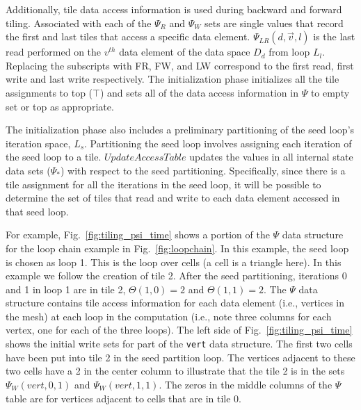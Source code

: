 Additionally, tile data access information is used during backward and forward tiling.
Associated with each of the $\Psi_R$ and $\Psi_W$ sets are single values that record the 
first and last tiles that access
a specific data element.
$\Psi_{LR}(d,\vec{v},l)$ is the last read performed on the $v^{th}$ data element of 
the data space $D_d$ from loop $L_l$.
Replacing the subscripts with FR, FW, and LW correspond to the first read, 
first write and last write respectively.
The initialization phase initializes all the tile assignments to top ($\top$) and sets
all of the data access information in $\Psi$ to empty set or top as appropriate.

The initialization phase also includes a preliminary partitioning of the seed loop's iteration space, $L_s$.
Partitioning the seed loop involves assigning each iteration of the seed loop to a tile. 
$UpdateAccessTable$ updates the values in all internal state data sets ($\Psi_*$) with respect to the 
seed partitioning.  Specifically, since there is a tile assignment for all the iterations in the
seed loop, it will be possible to determine the set of tiles that read and write to each data element
accessed in that seed loop.

For example, Fig.~\ref{fig:tiling_psi_time} shows a portion of the $\Psi$ data structure
for the loop chain example in Fig.~\ref{fig:loopchain}.  
In this example, the seed loop is chosen as loop 1.
This is the loop over cells (a cell is a triangle here).
In this example we follow the creation of tile 2.
After the seed partitioning, iterations 0 and 1 in loop 1 are in tile 2, 
$\Theta(1,0)=2$ and $\Theta(1,1)=2$.
The $\Psi$ data structure
contains tile access information for each data element (i.e., vertices in the mesh)
at each loop in the computation (i.e., note three columns for each vertex, one for each of the
three loops).  The left side of Fig.~\ref{fig:tiling_psi_time} shows the initial write
sets for part of the {\tt vert} data structure.  The first two cells have been put into
tile 2 in the seed partition loop.  The vertices adjacent to these two cells have
a 2 in the center column to illustrate that the tile 2 is in the sets $\Psi_W(vert,0,1)$ and $\Psi_W(vert,1,1)$.
The zeros in the middle columns of the $\Psi$ table are for vertices adjacent to
cells that are in tile 0.


